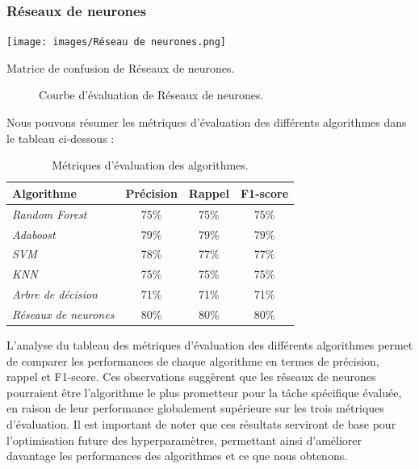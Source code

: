 \subsubsection*{Réseaux de neurones}
\begin{minipage}[t]{0.5\textwidth}
    \begin{table}[H]
        \centering
        \setlength{\fboxsep}{5pt}
        \setlength{\fboxrule}{0.5pt}
        \texttt{[image: images/Réseau de neurones.png]}
        \caption{Matrice de confusion de Réseaux de neurones.}
    \end{table}
\end{minipage}
\begin{minipage}[t]{0.5\textwidth}
    \begin{figure}[H]
        \centering
        \setlength{\fboxsep}{5pt}
        \setlength{\fboxrule}{0.5pt}
        \caption{Courbe d'évaluation de Réseaux de neurones.}
    \end{figure}
\end{minipage}
\newpage
Nous pouvons résumer les métriques d'évaluation des différents algorithmes dans le tableau ci-dessous :

\begin{table}[h]
\centering
\begin{tabular}{lccc}
\hline
Algorithme & Précision & Rappel & F1-score \\
\hline
\textit{Random Forest} & 75\% & 75\% & 75\% \\
\textit{Adaboost} & 79\% & 79\% & 79\% \\
\textit{SVM} & 78\% & 77\% & 77\% \\
\textit{KNN} & 75\% & 75\% & 75\% \\
\textit{Arbre de décision} & 71\% & 71\% & 71\% \\
\textit{Réseaux de neurones} & 80\% & 80\% & 80\% \\
\hline
\end{tabular}
\caption{Métriques d'évaluation des algorithmes.}

\end{table}

L'analyse du tableau des métriques d'évaluation des différents algorithmes permet de comparer les performances de chaque algorithme en termes de précision, rappel et F1-score. Ces observations suggèrent que les réseaux de neurones pourraient être l'algorithme le plus prometteur pour la tâche spécifique évaluée, en raison de leur performance globalement supérieure sur les trois métriques d'évaluation. Il est important de noter que ces résultats serviront de base pour l'optimisation future des hyperparamètres, permettant ainsi d'améliorer davantage les performances des algorithmes et ce que nous obtenons.

